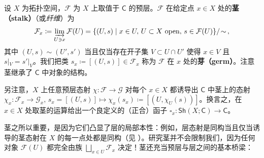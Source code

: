 \begin{Def}										%
设 $X$ 为拓扑空间，$\mathcal{F}$ 为 $X$ 上取值于 $\mathsf{C}$ 的预层。$\mathcal{F}$ 在给定点 $x\in X$ 处的\textbf{茎（stalk）}（或\textit{纤维}）为
\begin{equation}
	\mathcal{F}_x\coloneqq\varinjlim_{U\ni x}\mathcal{F}(U)= \{(U,s)\mid x\in U,\, U\subset X \text{ open}, \,s\in\mathcal{F}(U)\}/\!\sim\,,
\end{equation}
其中 $(U,s)\sim(U',s')$ 当且仅当存在开子集 $V\subset U\cap U'$ 使得 $x\in V$ 且 $s|_V=s'|_V$。我们把类 $s_x\coloneqq[(U,s)]\in\mathcal{F}_x$ 称为 $\mathcal{F}$ 在 $x$ 处的\textbf{芽（germ）}。注意茎继承了 $\mathsf{C}$ 中对象的结构。

另注意，$X$ 上任意预层态射 $\chi:\mathcal{F}\rightarrow\mathcal{G}$ 对每个 $x\in X$ 都诱导出 $\mathsf{C}$ 中茎上的态射 $\chi_x:\mathcal{F}_x\rightarrow\mathcal{G}_x,\,s_x=[(U,s)]\mapsto\chi_x(s_x)\coloneqq[(U,\chi_U(s))]$。换言之，在 $x\in X$ 处取茎的运算给出一个良定义的（正合）函子 $\square_x:\mathsf{Sh}(X;\mathsf{C})\rightarrow\mathsf{C}$。
\end{Def}

茎之所以重要，是因为它们凸显了层的局部本性：例如，层态射是同构当且仅当诱导的茎态射在 $X$ 的每一点处都是同构（见 \cite[Proposition II.1.1]{[Har77]}）。研究茎并不会限制我们，因为任何对象 $\mathcal{F}(U)$ 都完全由族 $\bigsqcup_{x\in U}\mathcal{F}_x$ 决定！茎还充当预层与层之间的基本桥梁：

